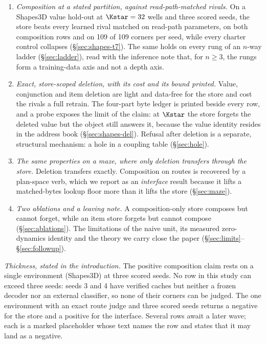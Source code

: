 \begin{enumerate}[leftmargin=*,itemsep=2pt]
\item \emph{Composition at a stated partition, against read-path-matched rivals.} On a
  Shapes3D value hold-out at $\Kstar=32$ wells and three scored seeds, the store beats every %
  learned rival matched on read-path parameters, on both composition rows and on 109 of 109 %
  corners per seed, while every charter control collapses
  (\S\ref{sec:shapes-t7}). The same holds on every rung of an $n$-way ladder
  (\S\ref{sec:ladder}), read with the inference note that, for $n\ge3$, the rungs form a
  training-data axis and not a depth axis.
\item \emph{Exact, store-scoped deletion, with its cost and its bound printed.} Value, conjunction and item deletion are light and data-free for the store and cost the rivals a full retrain. The four-part byte ledger is printed beside every row, and a probe exposes the
  limit of the claim: at $\Kstar$ the store forgets the deleted value but the object still
  answers it, because the value identity resides in the address book (\S\ref{sec:shapes-del}).
  Refusal after deletion is a separate, structural mechanism: a hole in a coupling table
  (\S\ref{sec:hole}).
\item \emph{The same properties on a maze, where only deletion transfers through the
  store.} Deletion transfers exactly. Composition on routes is recovered by a plan-space verb,
  which we report as an \emph{interface} result because it lifts a matched-bytes lookup
  floor more than it lifts the store (\S\ref{sec:maze}).
\item \emph{Two ablations and a leaving note.} A composition-only store composes but cannot
  forget, while an item store forgets but cannot compose (\S\ref{sec:ablations}). The
  limitations of the naive unit, its measured zero-dynamics identity and the theory we carry
  close the paper (\S\ref{sec:limits}--\S\ref{sec:followup}).
\end{enumerate}

\noindent\emph{Thickness, stated in the introduction.} The positive composition claim rests
on a single environment (Shapes3D) at three scored seeds. No row in this study can exceed three
seeds: seeds 3 and 4 have verified caches but neither a frozen decoder nor an external
classifier, so none of their corners can be judged. %
The one environment with an exact route judge and three scored seeds returns a negative for
the store and a positive for the interface. Several rows await a later wave; each is a
marked placeholder whose text names the row and states that it may land as a negative.
